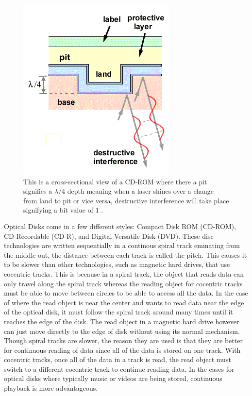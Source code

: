 \documentclass[ notitlepage, numerical, 11pt]{revtex4-1} %
\begin{document}
\begin{figure}[H]
\centerline{\includegraphics[scale=.9]{cdRom.png}}
\caption{ This is a cross-sectional view of a CD-ROM where there a pit signifies a $\lambda/4$ depth meaning when a laser shines over a change from land to pit or vice versa, destructive interference will take place signifying a bit value of 1 \cite{memory}.}
\label{cdRom}
\end{figure} 
Optical Disks come in a few different styles: Compact Disk ROM (CD-ROM), CD-Recordable (CD-R), and Digital Versatile Disk (DVD). These disc technologies are written sequentially in a continous spiral track eminating from the middle out, the distance between each track is called the pitch. This causes it to be slower than other technologies, such as magnetic hard drives, that use cocentric tracks. This is because in a spiral track, the object that reads data can only travel along the spiral track whereas the reading object for cocentric tracks must be able to move between circles to be able to access all the data. In the case of where the read object is near the center and wants to read data near the edge of the optical disk, it must follow the spiral track around many times until it reaches the edge of the disk. The read object in a magnetic hard drive however can just move directly to the edge of disk without using its normal mechanism. Though spiral tracks are slower, the reason they are used is that they are better for continuous reading of data since all of the data is stored on one track. With cocentric tracks, once all of the data in a track is read, the read object must switch to a different cocentric track to continue reading data. In the cases for optical disks where typically music or videos are being stored, continuous playback is more advantageous.
\end{document}
